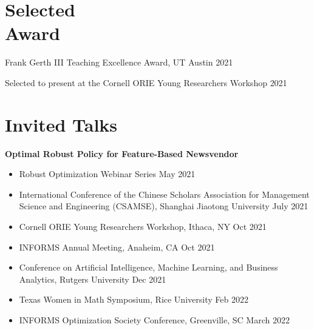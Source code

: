 \documentclass[margin,line]{res}
\begin{document}
\begin{resume}
\section{\sc Selected\\ 
Award}
Frank Gerth III Teaching Excellence Award, UT Austin \hfill {2021}

\vspace{-0.5cm}

Selected to present at the Cornell ORIE Young Researchers Workshop \hfill {2021}






\section{\sc Invited Talks}
{\bf Optimal Robust Policy for Feature-Based Newsvendor}
\begin{itemize}[leftmargin=0.15in]
\item Robust Optimization Webinar Series  \hfill { May 2021}\\ 
\vspace{-0.2in}
\item International Conference of the Chinese Scholars Association for Management Science and Engineering (CSAMSE), Shanghai Jiaotong University \hfill{July 2021}

\item Cornell ORIE Young Researchers Workshop, Ithaca, NY \hfill{Oct 2021}

\item INFORMS Annual Meeting, Anaheim, CA \hfill{Oct 2021}

\item Conference on Artificial Intelligence, Machine Learning, and Business Analytics, Rutgers University \hfill{Dec 2021}



\item Texas Women in Math Symposium, Rice University \hfill{Feb 2022}

\item INFORMS Optimization Society Conference, Greenville, SC  \hfill{March 2022}
\end{itemize}


\end{resume}
\end{document}
